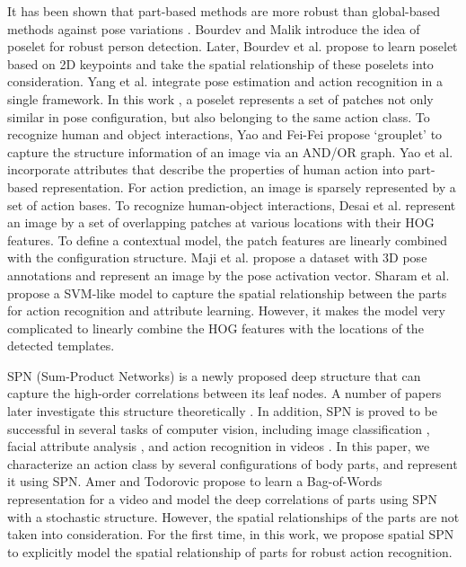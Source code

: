 \documentclass[journal]{IEEEtran}
\begin{document}
It has been shown that part-based methods are more robust than global-based methods against pose variations \cite{YangWMCVPR10,FelzenszwalbMR_CVPR_2008}. Bourdev and Malik \cite{BourdevMalikICCV09} introduce the idea of poselet for robust person detection.
Later, Bourdev \cite{BourdevPoseletsECCV10} et al. propose to learn poselet based on 2D keypoints and take the spatial relationship of these poselets into consideration. Yang et al. \cite{YangWMCVPR10} integrate pose estimation and action recognition in a single framework. In this work \cite{YangWMCVPR10}, a poselet represents a set of patches not only similar in pose configuration, but also belonging to the same action class. To recognize human and object interactions, Yao and Fei-Fei \cite{GroupletYaoBangpengFeifeiLI} propose `grouplet' to capture the structure information of an image via an AND/OR graph.  Yao et al. \cite{Yao11humanaction__Stanford40} incorporate attributes that describe the properties of human action into part-based representation. For action prediction, an image is sparsely represented by a set of action bases. To recognize human-object interactions, Desai et al. \cite{desai10_action} represent an image by a set of overlapping patches at various locations with their HOG features. To define a contextual model, the patch features are linearly combined with the configuration structure. Maji et al. \cite{MajiActionCVPR11} propose a dataset with 3D pose annotations and represent an image by the pose activation vector. Sharam et al. \cite{sharma:CVPR2013} propose a SVM-like model to capture the spatial relationship between the parts for action recognition and attribute learning. However, it makes the model very complicated to linearly combine the HOG features with the locations of the detected templates.



SPN (Sum-Product Networks) \cite{poon2011SPNIntroduce} is a newly proposed deep structure that can capture the high-order correlations between its leaf nodes. A number of papers later investigate this structure theoretically \cite{Delalleau11shallowvs,DirectIndirectSPNicml2014c1_rooshenas14}. In addition, SPN is proved to be successful in several tasks of computer vision, including image classification \cite{Discriminative_Learning_SPNNIPS2012_4516}, facial attribute analysis \cite{SPNWangXiaogangFacial}, and action recognition in videos \cite{SPN_video_action}.
In this paper, we characterize an action class by several configurations of body parts, and represent it using SPN.
Amer and Todorovic \cite{SPN_video_action} propose to learn a Bag-of-Words representation for a video and model the deep correlations of parts using SPN with a stochastic structure. However, the spatial relationships of the parts are not taken into consideration.
For the first time, in this work, we propose spatial SPN to explicitly model the spatial relationship of parts for robust action recognition.
\end{document}
